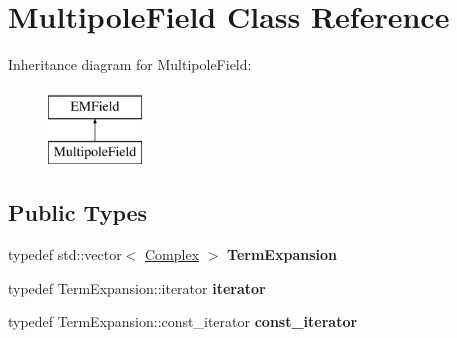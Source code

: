 \hypertarget{classMultipoleField}{}\section{Multipole\+Field Class Reference}
\label{classMultipoleField}
Inheritance diagram for Multipole\+Field\+:\begin{figure}[H]
\begin{center}
\leavevmode
\includegraphics[height=2.000000cm]{classMultipoleField}
\end{center}
\end{figure}
\subsection*{Public Types}
\begin{DoxyCompactItemize}
\item 
\mbox{\label{classMultipoleField_a86804e129a8722b84657911ee896c2c2}} 
typedef std\+::vector$<$ \hyperlink{classComplex}{Complex} $>$ {\bfseries Term\+Expansion}
\item 
\mbox{\label{classMultipoleField_ac0068be8fc703fc19723180af9cb2674}} 
typedef Term\+Expansion\+::iterator {\bfseries iterator}
\item 
\mbox{\label{classMultipoleField_ab37c9a704c9b8b76926f77bc18d1c24f}} 
typedef Term\+Expansion\+::const\+\_\+iterator {\bfseries const\+\_\+iterator}
\end{DoxyCompactItemize}
